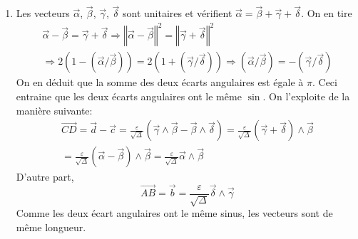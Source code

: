 \begin{enumerate}
\begin{enumerate}
 \item Les vecteurs $\overrightarrow \alpha$, $\overrightarrow \beta$, $\overrightarrow \gamma$, $\overrightarrow \delta$ sont unitaires et vérifient $\overrightarrow \alpha = \overrightarrow \beta + \overrightarrow \gamma + \overrightarrow \delta $. On en tire
\begin{multline*}
 \overrightarrow \alpha - \overrightarrow \beta= \overrightarrow \gamma + \overrightarrow \delta
\Rightarrow 
\left \Vert \overrightarrow \alpha - \overrightarrow \beta \right \Vert ^2 =
\left \Vert  \overrightarrow \gamma + \overrightarrow \delta  \right \Vert ^2 \\
\Rightarrow
2(1-(\overrightarrow \alpha / \overrightarrow \beta))
= 2(1+(\overrightarrow \gamma / \overrightarrow \delta))
\Rightarrow (\overrightarrow \alpha / \overrightarrow \beta) = - (\overrightarrow \gamma / \overrightarrow \delta)
\end{multline*}
On en déduit que la somme des deux écarts angulaires est égale à $\pi$. Ceci entraine que les deux écarts angulaires ont le même $\sin$. On l'exploite de la manière suivante:
\begin{multline*}
 \overrightarrow{CD}=\overrightarrow d - \overrightarrow c
= \frac{\varepsilon}{\sqrt{\Delta}}
\left(\overrightarrow \gamma \wedge \overrightarrow \beta - \overrightarrow \beta \wedge \overrightarrow \delta\right)
=  \frac{\varepsilon}{\sqrt{\Delta}}(\overrightarrow \gamma + \overrightarrow \delta)\wedge \overrightarrow \beta\\
=  \frac{\varepsilon}{\sqrt{\Delta}}(\overrightarrow \alpha - \overrightarrow \beta)\wedge \overrightarrow \beta
=  \frac{\varepsilon}{\sqrt{\Delta}} \overrightarrow \alpha \wedge \overrightarrow \beta
\end{multline*}
D'autre part,
\begin{displaymath}
 \overrightarrow{AB}=\overrightarrow b
= \frac{\varepsilon}{\sqrt{\Delta}} \overrightarrow \delta \wedge \overrightarrow \gamma 
\end{displaymath}
Comme les deux écart angulaires ont le même sinus, les vecteurs sont de même longueur.


\end{enumerate}
\end{enumerate}
